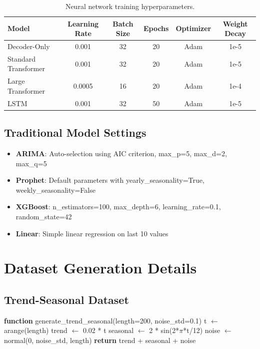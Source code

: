 \documentclass[11pt]{article}
\begin{document}
\begin{table}[h]
\centering
\begin{tabular}{@{}lccccc@{}}
\toprule
Model & Learning Rate & Batch Size & Epochs & Optimizer & Weight Decay \\
\midrule
Decoder-Only & 0.001 & 32 & 20 & Adam & 1e-5 \\
Standard Transformer & 0.001 & 32 & 20 & Adam & 1e-5 \\
Large Transformer & 0.0005 & 16 & 20 & Adam & 1e-4 \\
LSTM & 0.001 & 32 & 50 & Adam & 1e-5 \\
\bottomrule
\end{tabular}
\caption{Neural network training hyperparameters.}
\end{table}

\subsection{Traditional Model Settings}

\begin{itemize}
\item \textbf{ARIMA}: Auto-selection using AIC criterion, max\_p=5, max\_d=2, max\_q=5
\item \textbf{Prophet}: Default parameters with yearly\_seasonality=True, weekly\_seasonality=False
\item \textbf{XGBoost}: n\_estimators=100, max\_depth=6, learning\_rate=0.1, random\_state=42
\item \textbf{Linear}: Simple linear regression on last 10 values
\end{itemize}

\section{Dataset Generation Details}

\subsection{Trend-Seasonal Dataset}

\begin{algorithmic}
\STATE \textbf{function} generate\_trend\_seasonal(length=200, noise\_std=0.1)
\STATE \quad t $\leftarrow$ arange(length)
\STATE \quad trend $\leftarrow$ 0.02 * t 
\STATE \quad seasonal $\leftarrow$ 2 * sin(2*$\pi$*t/12) 
\STATE \quad noise $\leftarrow$ normal(0, noise\_std, length)
\STATE \quad \textbf{return} trend + seasonal + noise
\end{algorithmic}
\end{document}
